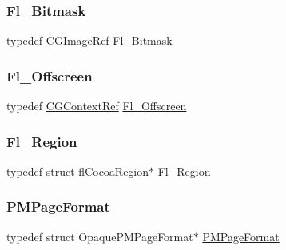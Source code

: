 \mbox{\label{mac_8_h_a90133b6f8cfb11ab81d83b2c4d91310d}} 
\subsubsection{\texorpdfstring{Fl\+\_\+\+Bitmask}{Fl\_Bitmask}}
{\footnotesize\ttfamily typedef \hyperlink{mac_8_h_a75461eac74c23c49c936eb8811388b88}{C\+G\+Image\+Ref} \hyperlink{mac_8_h_a90133b6f8cfb11ab81d83b2c4d91310d}{Fl\+\_\+\+Bitmask}}

\mbox{\label{mac_8_h_ad24d9679e17ea5ffa910ed355d4df340}} 
\subsubsection{\texorpdfstring{Fl\+\_\+\+Offscreen}{Fl\_Offscreen}}
{\footnotesize\ttfamily typedef \hyperlink{mac_8_h_aa24159a5753580ec784c2fd390213c7f}{C\+G\+Context\+Ref} \hyperlink{mac_8_h_ad24d9679e17ea5ffa910ed355d4df340}{Fl\+\_\+\+Offscreen}}

\mbox{\label{mac_8_h_ac80c9f95cc93c989c5a953a749f45cb6}} 
\subsubsection{\texorpdfstring{Fl\+\_\+\+Region}{Fl\_Region}}
{\footnotesize\ttfamily typedef struct fl\+Cocoa\+Region$\ast$ \hyperlink{mac_8_h_ac80c9f95cc93c989c5a953a749f45cb6}{Fl\+\_\+\+Region}}

\mbox{\label{mac_8_h_afda4f1155b3e6fd1f500313ed4376138}} 
\subsubsection{\texorpdfstring{P\+M\+Page\+Format}{PMPageFormat}}
{\footnotesize\ttfamily typedef struct Opaque\+P\+M\+Page\+Format$\ast$ \hyperlink{mac_8_h_afda4f1155b3e6fd1f500313ed4376138}{P\+M\+Page\+Format}}

